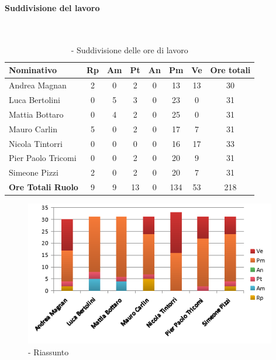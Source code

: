 \documentclass[./PianoDiProgetto.tex]{subfiles}
\begin{document}
	\subsubsection{\PerC}
				\paragraph{Suddivisione del lavoro}\

	\begin{table}[H]
		\begin{tabularx}{\textwidth}{l  * {6}{c}  c}
			\toprule
			\textbf{Nominativo} & \textbf{Rp} & \textbf{Am} & \textbf{Pt}
						& \textbf{An} & \textbf{Pm} & \textbf{Ve} & \textbf{Ore totali} \\
			\midrule
			Andrea Magnan  & 2 & 0 & 2 & 0 & 13 & 13 & 30 \\
			Luca Bertolini  & 0 & 5 & 3 & 0 & 23 & 0 & 31 \\
			Mattia Bottaro  & 0 & 4 & 2 & 0 & 25 & 0 & 31 \\
			Mauro Carlin  & 5 & 0 & 2 & 0 & 17 & 7 & 31 \\
			Nicola Tintorri  & 0 & 0 & 0 & 0 & 16 & 17 & 33 \\
			Pier Paolo Tricomi  & 0 & 0 & 2 & 0 & 20 & 9 & 31 \\
			Simeone Pizzi & 2 & 0 & 2 & 0 & 20 & 7 & 31 \\
			\midrule
			\textbf{Ore Totali Ruolo} & 9 & 9 & 13 & 0 & 134 & 53 & 218 \\
			\bottomrule

		\end{tabularx}
		\caption{\PerC{} - Suddivisione delle ore di lavoro}
	\end{table}

\vfill

	\begin{figure}[H]
		\centering
		\includegraphics[width=11cm, trim=1cm 0cm 1cm 0cm]{grafici/C-persona}
			\caption{\PerC{}- Riassunto}
	\end{figure}
\vfill
\end{document}
